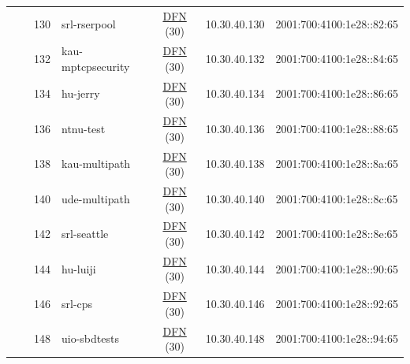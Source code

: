 \begin{small}
\begin{center}
\begin{longtable}{|c|c|c|c|c|c|c|c|}
  &  & \tiny{130} & \multicolumn{1}{|l|}{\tiny{srl-rserpool}} & \multicolumn{2}{|c|}{\tiny{\href{https://www.dfn.de}{DFN} (30)}} & \tiny{10.30.40.130} & \tiny{2001:700:4100:1e28::82:65} \\* \cline{3-3}\cline{4-4}\cline{5-5}\cline{6-6}\cline{7-7}\cline{8-8}
  &  & \tiny{132} & \multicolumn{1}{|l|}{\tiny{kau-mptcpsecurity}} & \multicolumn{2}{|c|}{\tiny{\href{https://www.dfn.de}{DFN} (30)}} & \tiny{10.30.40.132} & \tiny{2001:700:4100:1e28::84:65} \\* \cline{3-3}\cline{4-4}\cline{5-5}\cline{6-6}\cline{7-7}\cline{8-8}
  &  & \tiny{134} & \multicolumn{1}{|l|}{\tiny{hu-jerry}} & \multicolumn{2}{|c|}{\tiny{\href{https://www.dfn.de}{DFN} (30)}} & \tiny{10.30.40.134} & \tiny{2001:700:4100:1e28::86:65} \\* \cline{3-3}\cline{4-4}\cline{5-5}\cline{6-6}\cline{7-7}\cline{8-8}
  &  & \tiny{136} & \multicolumn{1}{|l|}{\tiny{ntnu-test}} & \multicolumn{2}{|c|}{\tiny{\href{https://www.dfn.de}{DFN} (30)}} & \tiny{10.30.40.136} & \tiny{2001:700:4100:1e28::88:65} \\* \cline{3-3}\cline{4-4}\cline{5-5}\cline{6-6}\cline{7-7}\cline{8-8}
  &  & \tiny{138} & \multicolumn{1}{|l|}{\tiny{kau-multipath}} & \multicolumn{2}{|c|}{\tiny{\href{https://www.dfn.de}{DFN} (30)}} & \tiny{10.30.40.138} & \tiny{2001:700:4100:1e28::8a:65} \\* \cline{3-3}\cline{4-4}\cline{5-5}\cline{6-6}\cline{7-7}\cline{8-8}
  &  & \tiny{140} & \multicolumn{1}{|l|}{\tiny{ude-multipath}} & \multicolumn{2}{|c|}{\tiny{\href{https://www.dfn.de}{DFN} (30)}} & \tiny{10.30.40.140} & \tiny{2001:700:4100:1e28::8c:65} \\* \cline{3-3}\cline{4-4}\cline{5-5}\cline{6-6}\cline{7-7}\cline{8-8}
  &  & \tiny{142} & \multicolumn{1}{|l|}{\tiny{srl-seattle}} & \multicolumn{2}{|c|}{\tiny{\href{https://www.dfn.de}{DFN} (30)}} & \tiny{10.30.40.142} & \tiny{2001:700:4100:1e28::8e:65} \\* \cline{3-3}\cline{4-4}\cline{5-5}\cline{6-6}\cline{7-7}\cline{8-8}
  &  & \tiny{144} & \multicolumn{1}{|l|}{\tiny{hu-luiji}} & \multicolumn{2}{|c|}{\tiny{\href{https://www.dfn.de}{DFN} (30)}} & \tiny{10.30.40.144} & \tiny{2001:700:4100:1e28::90:65} \\* \cline{3-3}\cline{4-4}\cline{5-5}\cline{6-6}\cline{7-7}\cline{8-8}
  &  & \tiny{146} & \multicolumn{1}{|l|}{\tiny{srl-cps}} & \multicolumn{2}{|c|}{\tiny{\href{https://www.dfn.de}{DFN} (30)}} & \tiny{10.30.40.146} & \tiny{2001:700:4100:1e28::92:65} \\* \cline{3-3}\cline{4-4}\cline{5-5}\cline{6-6}\cline{7-7}\cline{8-8}
  &  & \tiny{148} & \multicolumn{1}{|l|}{\tiny{uio-sbdtests}} & \multicolumn{2}{|c|}{\tiny{\href{https://www.dfn.de}{DFN} (30)}} & \tiny{10.30.40.148} & \tiny{2001:700:4100:1e28::94:65} \\ \hline
\end{longtable}
\end{center}
\end{small}



